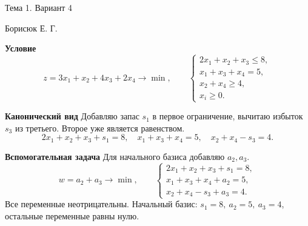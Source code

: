 \documentclass[12pt,a4paper]{article}
\begin{document}
\begin{center}\large Тема 1. Вариант 4\end{center}
Борисюк Е. Г.
\par\textbf{Условие}\[
z=3x_1+x_2+4x_3+2x_4\to\min,\qquad
\begin{cases}
2x_1+x_2+x_3\le8,\\
x_1+x_3+x_4=5,\\
x_2+x_4\ge4,\\
x_i\ge0.
\end{cases}
\]
\par\textbf{Канонический вид}
Добавляю запас $s_1$ в первое ограничение, вычитаю избыток $s_3$ из третьего. Второе уже является равенством.
\[
2x_1+x_2+x_3+s_1=8,\quad
x_1+x_3+x_4=5,\quad
x_2+x_4-s_3=4.
\]
\par\textbf{Вспомогательная задача}
Для начального базиса добавляю $a_2,a_3$.
\[
w=a_2+a_3\to\min,\qquad
\begin{cases}
2x_1+x_2+x_3+s_1=8,\\
x_1+x_3+x_4+a_2=5,\\
x_2+x_4-s_3+a_3=4.
\end{cases}
\]
Все переменные неотрицательны. Начальный базис:
$s_1=8,\ a_2=5,\ a_3=4$, остальные переменные равны нулю.
\end{document}
